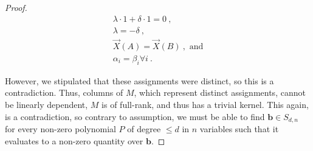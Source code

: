\begin{proof}
        \begin{gather*}
            \lambda\cdot 1 + \delta\cdot 1 = 0~, \\ 
            \lambda = -\delta~,\\
            \vec{X}(A) = \vec{X}(B)~, \text{ and}\\
            \alpha_i = \beta_i \forall i~.
        \end{gather*}

        However, we stipulated that these assignments were distinct, so this is
        a contradiction. Thus, columns of \(M\), which represent distinct
        assignments, cannot be linearly dependent, \(M\) is of full-rank, and
        thus has a trivial kernel. This again, is a contradiction, so contrary
        to assumption, we must be able to find \(\mathbf{b} \in S_{d, n}\) for
        every non-zero polynomial \(P\) of degree \(\leq d\) in \(n\) variables
        such that it evaluates to a non-zero quantity over \(\mathbf{b}\).
    
\end{proof}








